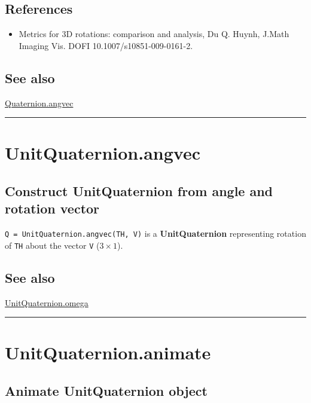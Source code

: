 \subsection*{References}
\begin{itemize}
  \item Metrics for 3D rotations: comparison and analysis, Du Q. Huynh,    J.Math Imaging Vis. DOFI 10.1007/s10851-009-0161-2.
\end{itemize}

\subsection*{See also}


\hyperlink{Quaternion.angvec}{\color{blue} Quaternion.angvec}

\vspace{1.5ex}\hrule

\hypertarget{UnitQuaternion.angvec}{\section*{UnitQuaternion.angvec}}
\subsection*{Construct UnitQuaternion from angle and rotation vector}


\texttt{Q = UnitQuaternion.angvec(TH, V)} is a \textbf{\color{red} UnitQuaternion} representing rotation of \texttt{TH} about the vector \texttt{V} ($3 \times 1$).


\subsection*{See also}


\hyperlink{UnitQuaternion.omega}{\color{blue} UnitQuaternion.omega}

\vspace{1.5ex}\hrule

\hypertarget{UnitQuaternion.animate}{\section*{UnitQuaternion.animate}}
\subsection*{Animate UnitQuaternion object}


